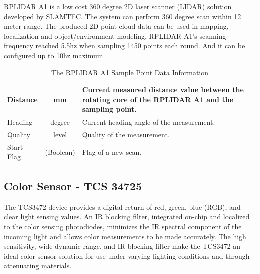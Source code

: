 \documentclass[english,project]{buwthesis}
\begin{document}
RPLIDAR A1 is a low cost 360 degree 2D laser scanner (LIDAR) solution developed by SLAMTEC. The system can perform 360 degree scan within 12 meter range. The produced 2D point cloud data can be used in mapping, localization and object/environment modeling. RPLIDAR A1's scanning frequency reached 5.5hz when sampling 1450 points each round. And it can be configured up to 10hz maximum.\cite{rplidarA1M8Datasheet}

\begin{table}[ht]
\centering
\begin{tabular}{|l|c|p{9cm}|}\hline
Distance         & mm       & Current measured distance value between the rotating core of the RPLIDAR A1 and the sampling point. \\ \hline
Heading          & degree   & Current heading angle of the measurement. \\ \hline
Quality          & level    & Quality of the measurement. \\ \hline
Start Flag       & (Boolean) & Flag of a new scan. \\ \hline
\end{tabular}
\caption{The RPLIDAR A1 Sample Point Data Information\cite{rplidarA1M8Datasheet}}
\label{tab:rplidar_data_info}
\end{table}


\subsection{Color Sensor - TCS 34725}

The TCS3472 device provides a digital return of red, green, blue (RGB), and clear light sensing values. An IR blocking filter, integrated on-chip and localized to the color sensing photodiodes, minimizes the IR spectral component of the incoming light and allows color measurements to be made accurately. The high sensitivity, wide dynamic range, and IR blocking filter make the TCS3472 an ideal color sensor solution for use under varying lighting conditions and through attenuating materials.\cite{tcs34725datasheet}
\end{document}
